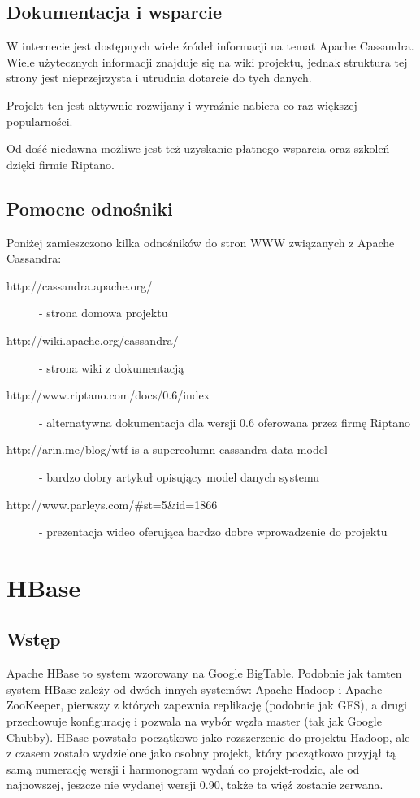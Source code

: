 \subsection*{Dokumentacja i wsparcie}

W internecie jest dostępnych wiele źródeł informacji na temat Apache Cassandra.
Wiele użytecznych informacji znajduje się na wiki projektu, jednak struktura tej strony jest nieprzejrzysta i utrudnia dotarcie do tych danych.

Projekt ten jest aktywnie rozwijany i wyraźnie nabiera co raz większej popularności.

Od dość niedawna możliwe jest też uzyskanie płatnego wsparcia oraz szkoleń dzięki firmie Riptano.

\subsection*{Pomocne odnośniki}

Poniżej zamieszczono kilka odnośników do stron WWW związanych z Apache Cassandra:

\begin{description}
 \item [http://cassandra.apache.org/] - strona domowa projektu
 \item [http://wiki.apache.org/cassandra/] - strona wiki z dokumentacją
 \item [http://www.riptano.com/docs/0.6/index] - alternatywna dokumentacja dla wersji 0.6 oferowana przez firmę Riptano
 \item [http://arin.me/blog/wtf-is-a-supercolumn-cassandra-data-model] - bardzo dobry artykuł opisujący model danych systemu
 \item [http://www.parleys.com/\#st=5\&id=1866] - prezentacja wideo oferująca bardzo dobre wprowadzenie do projektu
\end{description}

\section{HBase}
\label{sec:hbase}

\subsection*{Wstęp}

Apache HBase to system wzorowany na Google BigTable.
Podobnie jak tamten system HBase zależy od dwóch innych systemów: Apache Hadoop i Apache ZooKeeper, pierwszy z których zapewnia replikację (podobnie jak GFS), a drugi przechowuje konfigurację i pozwala na wybór węzła master (tak jak Google Chubby).
HBase powstało początkowo jako rozszerzenie do projektu Hadoop, ale z czasem zostało wydzielone jako osobny projekt, który początkowo przyjął tą samą numerację wersji i harmonogram wydań co projekt-rodzic, ale od najnowszej, jeszcze nie wydanej wersji 0.90, także ta więź zostanie zerwana.


